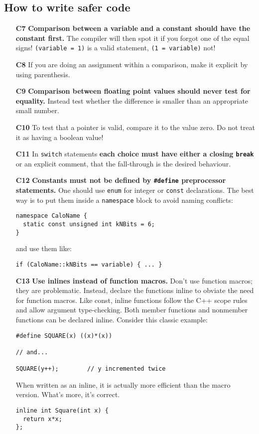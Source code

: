 \documentclass[a4paper,10pt]{article}
\begin{document}
\subsection{How to write safer code}
\begin{itemize}
\item[\bf C7] {\bf Comparison between a variable and a constant should have
  the constant first.} The compiler will then spot it if you forgot one of
  the equal signs! {\tt (variable = 1)} is a valid statement,
  {\tt (1 = variable)} not!
\item[\bf C8] If you are doing an assignment within a comparison, make it
  explicit by using parenthesis.
\item[\bf C9] {\bf Comparison between floating point values should never test
  for equality.} Instead test whether the difference is smaller than an
  appropriate small number.
\item[\bf C10] To test that a pointer is valid, compare it to the value zero.
  Do not treat it as having a boolean value!
\item[\bf C11] In {\tt switch} statements {\bf each choice must have either
  a closing {\tt break}} or an explicit comment, that the fall-through is
  the desired behaviour.
\item[\bf C12] {\bf Constants must not be defined by {\tt \#define} preprocessor
  statements.} One should use {\tt enum} for integer or {\tt const} declarations.
  The best way is to put them inside a {\tt namespace} block to avoid
  naming conflicts:
  \begin{verbatim}
namespace CaloName {
  static const unsigned int kNBits = 6;
}
  \end{verbatim}
  and use them like:
  \begin{verbatim}
if (CaloName::kNBits == variable) { ... }
  \end{verbatim}
\item[\bf C13] {\bf Use inlines instead of function macros.} Don't use
  function macros; they are problematic. Instead, declare the functions
  inline to obviate the need for function macros.
  Like const, inline functions follow the C++ scope rules and allow argument
  type-checking. Both member functions and nonmember functions can be
  declared inline. Consider this classic example:
  \begin{verbatim}
#define SQUARE(x) ((x)*(x))

// and...

SQUARE(y++);        // y incremented twice
  \end{verbatim}
  When written as an inline, it is actually more efficient than the macro
  version. What's more, it's correct.
  \begin{verbatim}
inline int Square(int x) {
  return x*x;
};


\end{verbatim}
\end{itemize}
\end{document}
